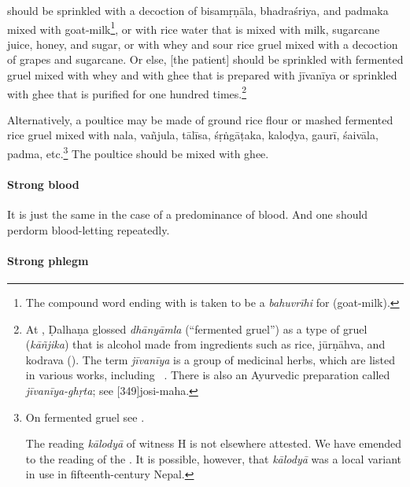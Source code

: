 \begin{translation}
 should be sprinkled with a decoction of
\gls{bisamṛṇāla}, \gls{bhadraśriya}, and \gls{padmaka} mixed with
goat-milk\footnote{The compound word ending with  is
    taken to be a \textit{bahuvrīhi} for  (goat-milk).},
    or with rice water that is mixed with milk, sugarcane juice, honey,
    and sugar, or with whey and sour rice gruel mixed with a decoction of
    grapes and sugarcane. Or else, [the patient] should be sprinkled with
    fermented gruel mixed with whey and with ghee that is prepared with
    \gls{jīvanīya} or sprinkled with ghee that is purified for one
    hundred times.\footnote{At , Ḍalhaṇa glossed
        \emph{dhānyāmla} (``fermented gruel'') as a type of gruel
        (\emph{kāñjika}) that is alcohol made from ingredients such as rice,
        \gls{jūrṇāhva}, and \gls{kodrava} (). The term \emph{jīvanīya} is a
        group of medicinal herbs, which are listed in various works, including
        \CS\ . There is also an Ayurvedic preparation called
        \emph{jīvanīya-ghṛta}; see [349]{josi-maha}.\label{jīvanīya}} %

Alternatively, a poultice may
be made of ground rice flour or mashed fermented rice gruel mixed with
\gls{nala}, \gls{vañjula},
\gls{tālīsa},
\gls{śṛṅgāṭaka}, 
\gls{kaloḍya},
\gls{gaurī}, \gls{śaivāla},
\gls{padma}, etc.\footnote{On fermented  gruel see \cite[23, et passim]{mchu-2021}.

The reading \emph{kālodyā} of witness H is not elsewhere attested. We
have emended to the reading of the \citep[425]{vulgate}. It is
possible, however, that \emph{kālodyā} was a local variant in use in
fifteenth-century Nepal.} The poultice should be mixed with ghee.


\paragraph{Strong blood}    

\item[9]

It is just the same in the case of a predominance of blood. And
one should perdorm blood-letting repeatedly.


\paragraph{Strong phlegm}  


\end{translation}
